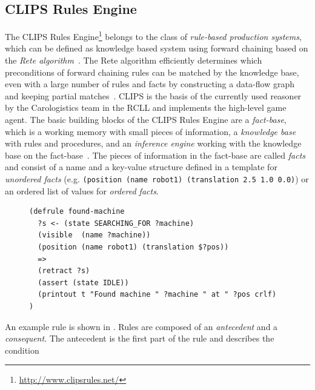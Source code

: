 \subsection{CLIPS Rules Engine}
The CLIPS Rules Engine\footnote{\url{http://www.clipsrules.net/}} belongs to the class of \emph{rule-based
  production systems}, which can be defined as knowledge based system
using forward chaining based on the \emph{Rete
  algorithm}~\cite{aimodern}. The Rete algorithm efficiently determines
which preconditions of forward chaining rules can be matched by the
knowledge base, even with a large number of rules and facts by
constructing a data-flow graph and keeping partial
matches~\cite{Rete}. CLIPS is the basis of the currently used reasoner
by the Carologistics team in the RCLL and implements the high-level
game agent. The basic building blocks of the CLIPS Rules Engine are a
\emph{fact-base}, which is a working memory with small pieces of
information, a \emph{knowledge base} with rules and procedures, and an
\emph{inference engine} working with the knowledge base on the
fact-base~\cite{CLIPS-RM}. The pieces of information in the fact-base
are called \emph{facts} and consist of a name and a key-value
structure defined in a template for \emph{unordered facts}
(e.g. \texttt{(position~(name~robot1)~(translation~2.5~1.0~0.0)}) or an
ordered list of values for \emph{ordered facts}.
\begin{figure}
\begin{lstlisting}[showlines,style=ReallySmallCLIPS, caption={CLIPS
    rule to change a robots state when the object it searched for is visible.},
  label=lst:clips-rule,
  emph={skill, args, state, target, res},
  emphstyle=\bfseries\color{green!80!black},
  emph={[2]\?skill, \$\?args, wait-for-lock, \?target, use,
  WAIT-FOR-LOCK, SKILL-EXECUTION, running},
  emphstyle={[2]\bfseries\color{blue!80!black}},
  morekeywords={retract, assert, modify, skill-call, skill-to-execute,
  wait-for-lock}]
(defrule found-machine
  ?s <- (state SEARCHING_FOR ?machine)
  (visible  (name ?machine))
  (position (name robot1) (translation $?pos))
  =>  
  (retract ?s) 
  (assert (state IDLE))
  (printout t "Found machine " ?machine " at " ?pos crlf)
)
\end{lstlisting} %
\end{figure}
An example rule is shown in . Rules are
composed of an \emph{antecedent} and a \emph{consequent}. The
antecedent is the first part of the rule and describes the condition
